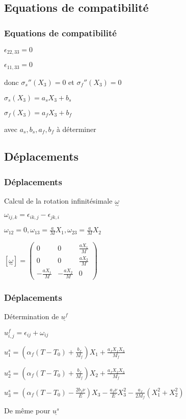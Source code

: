 \subsection{Equations de compatibilité} 
\begin{frame}
    \frametitle{Equations de compatibilité}
        \item $\epsilon_{22,33}=0$
        \item $\epsilon_{11,33}=0$
        \item donc $\sigma_s''(X_3)=0$ et $\sigma_f''(X_3)=0$
        \item $\sigma_s(X_3)=a_sX_3+b_s$
        \item $\sigma_f(X_3)=a_fX_3+b_f$
        \item avec $a_s, b_s, a_f, b_f$ à déterminer
        
\end{frame}  

\subsection{Déplacements} 
\begin{frame}
    \frametitle{Déplacements}
        \item Calcul de la rotation infinitésimale $\underset{\sim}{\omega}$
        \item $\omega_{ij,k}=\epsilon_{ik,j}-\epsilon_{jk,i}$
        \item $\omega_{12}=0,\omega_{13}=\frac{a}{M}X_1,\omega_{23}=\frac{a}{M}X_2$
        \item $[\underset{\sim}{\omega}]=\begin{pmatrix}0&0&\frac{aX_1}{M}\\0&0&\frac{aX_2}{M}\\-\frac{aX_1}{M}&-\frac{aX_2}{M}&0\end{pmatrix}$
        
        
\end{frame}  
\begin{frame}
    \frametitle{Déplacements}
        \item Détermination de  $\underline{u^f}$
        \item $u_{i,j}^f=\epsilon_{ij}+\omega_{ij}$
        \item $u_1^s=(\alpha_f(T-T_0)+\frac{b_f}{M_f})X_1+\frac{a_fX_1X_3}{M_f}$
        \item $u_2^s=(\alpha_f(T-T_0)+\frac{b_f}{M_f})X_2+\frac{a_fX_2X_3}{M_f}$
        \item $u_3^s=(\alpha_f(T-T_0)-\frac{2b_f\nu}{E})X_3-\frac{a_f\nu}{E}X_3^2-\frac{a_f}{2M_f}(X_1^2+X_2^2)$
        \item De même pour $\underline{u^s}$

\end{frame}  

